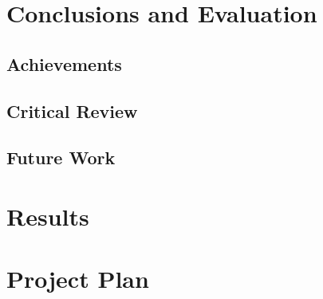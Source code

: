 \documentclass[12pt,leqno]{report}
\begin{document}
\chapter{Conclusions and Evaluation}
\section{Achievements}
\section{Critical Review}
\section{Future Work}

\appendix
\chapter{Results}
\chapter{Project Plan}
\end{document}
